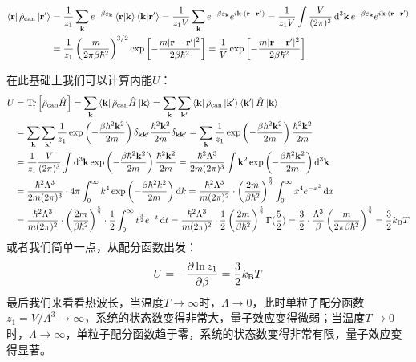 \[\begin{aligned}
\bra{\mathbf{r}}\hat{\rho}_{\rm can}\ket{\mathbf{r}'}&=\frac{1}{z_1}\sum_{\mathbf{k}}e^{-\beta\varepsilon_{\mathbf{k}}}\bra{\mathbf{r}}\ket{\mathbf{k}}\bra{\mathbf{k}}\ket{\mathbf{r}'}=\frac{1}{z_1V}\sum_{\mathbf{k}}e^{-\beta\varepsilon_{\mathbf{k}}}e^{i\mathbf{k}\cdot(\mathbf{r}-\mathbf{r}')}=\frac{1}{z_1V}\int\frac{V}{(2\pi)^3}\dd[3]{\mathbf{k}} e^{-\beta\varepsilon_{\mathbf{k}}}e^{i\mathbf{k}\cdot(\mathbf{r}-\mathbf{r}')}\\
&=\frac{1}{z_1}\left(\frac{m}{2\pi\beta\hbar^2}\right)^{3/2}\exp\left[-\frac{m|\mathbf{r}-\mathbf{r}'|^2}{2\beta\hbar^2}\right]=\frac{1}{V}\exp\left[-\frac{m|\mathbf{r}-\mathbf{r}'|^2}{2\beta\hbar^2}\right]
\end{aligned}\]

在此基础上我们可以计算内能$U$：
\[\begin{aligned}
U&=\Tr\left[\hat{\rho}_{\rm can}\hat{H}\right]=\sum_{\mathbf{k}}\bra{\mathbf{k}}\hat{\rho}_{\rm can}\hat{H}\ket{\mathbf{k}}=\sum_{\mathbf{k}}\sum_{\mathbf{k}'}\bra{\mathbf{k}}\hat{\rho}_{\rm can}\ket{\mathbf{k}'}\bra{\mathbf{k}'}\hat{H}\ket{\mathbf{k}}\\
&=\sum_{\mathbf{k}}\sum_{\mathbf{k}'}\frac{1}{z_1}\exp\left(-\frac{\beta\hbar^2\mathbf{k}^2}{2m}\right)\delta_{\mathbf{k}\mathbf{k}'}\frac{\hbar^2\mathbf{k}^2}{2m}\delta_{\mathbf{k}\mathbf{k}'}=\sum_{\mathbf{k}}\frac{1}{z_1}\exp\left(-\frac{\beta\hbar^2\mathbf{k}^2}{2m}\right)\frac{\hbar^2\mathbf{k}^2}{2m}\\
&=\frac{1}{z_1}\frac{V}{(2\pi)^3}\int\dd[3]{\mathbf{k}}\exp\left(-\frac{\beta\hbar^2\mathbf{k}^2}{2m}\right)\frac{\hbar^2\mathbf{k}^2}{2m}=\frac{\hbar^2\Lambda^3}{2m(2\pi)^3}\int\mathbf{k}^2\exp\left(-\frac{\beta\hbar^2\mathbf{k}^2}{2m}\right)\dd[3]{\mathbf{k}}\\
&=\frac{\hbar^2\Lambda^3}{2m(2\pi)^3}\cdot 4\pi\int_0^{\infty} k^4\exp\left(-\frac{\beta\hbar^2k^2}{2m}\right)\dd{k}=\frac{\hbar^2\Lambda^3}{m(2\pi)^2}\cdot \left(\frac{2m}{\beta\hbar^2}\right)^{\frac{5}{2}}\int_0^{\infty} x^4e^{-x^2}\dd{x}\\
&=\frac{\hbar^2\Lambda^3}{m(2\pi)^2}\cdot \left(\frac{2m}{\beta\hbar^2}\right)^{\frac{5}{2}}\cdot\frac{1}{2}\int_0^{\infty} t^{\frac{3}{2}}e^{-t}\dd{t}=\frac{\hbar^2\Lambda^3}{m(2\pi)^2}\cdot\frac{1}{2}\left(\frac{2m}{\beta\hbar^2}\right)^{\frac{5}{2}}\Gamma(\frac{5}{2})=\frac{3}{2}\cdot\frac{\Lambda^3}{\beta}\left(\frac{m}{2\pi\beta\hbar^2}\right)^{\frac{3}{2}}=\frac{3}{2}k_{\rm B}T
\end{aligned}\]
或者我们简单一点，从配分函数出发：
\[U=-\pdv{\ln z_1}{\beta}=\frac{3}{2}k_{\rm B}T\]
最后我们来看看热波长，当温度$T\to\infty$时，$\Lambda\to 0$，此时单粒子配分函数$z_1=V/\Lambda^3\to\infty$，系统的状态数变得非常大，量子效应变得微弱；当温度$T\to 0$时，$\Lambda\to\infty$，单粒子配分函数趋于零，系统的状态数变得非常有限，量子效应变得显著。

